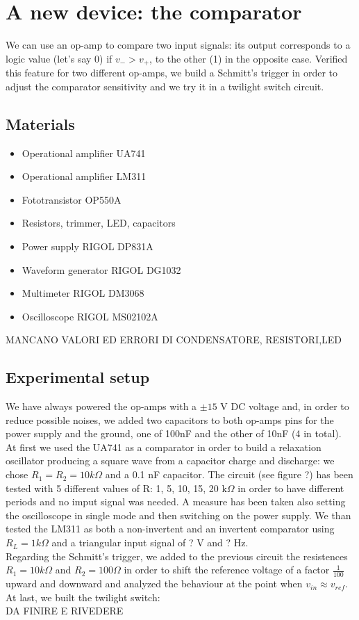 
\chapter{A new device: the comparator}
We can use an op-amp to compare two input signals: its output corresponds to a logic value (let's say 0) if $v_- > v_+$, to the other (1) in the opposite case. Verified this feature for two different op-amps, we build a Schmitt's trigger in order to adjust the comparator sensitivity and we try it in a twilight switch circuit.

\section{Materials}
\begin{itemize}
\item Operational amplifier UA741
\item Operational amplifier LM311
\item Fototransistor OP550A
\item Resistors, trimmer, LED, capacitors
\item Power supply RIGOL DP831A
\item Waveform generator RIGOL DG1032
\item Multimeter RIGOL DM3068
\item Oscilloscope RIGOL MS02102A
\end{itemize}
MANCANO VALORI ED ERRORI DI CONDENSATORE, RESISTORI,LED

\section{Experimental setup}
We have always powered the op-amps with a $\pm15$ V DC voltage and, in order to reduce possible noises, we added two capacitors to both op-amps pins for the power supply and the ground, one of 100nF and the other of 10nF (4 in total).\\
At first we used the UA741 as a comparator in order to build a relaxation oscillator producing a square wave from a capacitor charge and discharge: we chose $R_1 = R_2 = 10k\Omega$ and a 0.1 nF capacitor. The circuit (see figure ?) has been tested with 5 different values of R: 1, 5, 10, 15, 20 k$\Omega$ in order to have different periods and no imput signal was needed. A measure has been taken also setting the oscilloscope in single mode and then switching on the power supply.
We than tested the LM311 as both a non-invertent and an invertent comparator using $R_L = 1k\Omega$ and a triangular input signal of ? V and ? Hz.\\
Regarding the Schmitt's trigger, we added to the previous circuit the resistences $R_1 = 10 k\Omega$ and $R_2 = 100 \Omega$ in order to shift the reference voltage of a factor $\frac{1}{100}$ upward and downward and analyzed the behaviour at the point when $v_{in}\approx v_{ref}$.\\
At last, we built the twilight switch:\\
DA FINIRE E RIVEDERE


